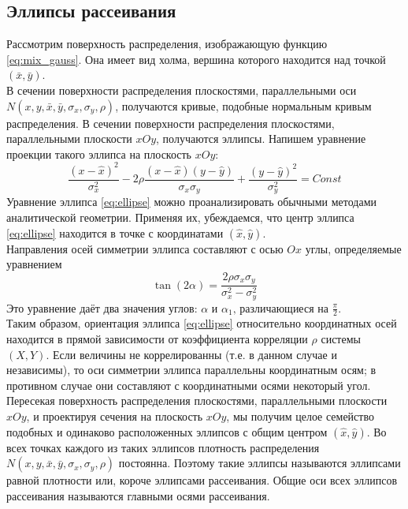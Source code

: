 \subsection{Эллипсы рассеивания}
Рассмотрим поверхность распределения, изображающую функцию \eqref{eq:mix_gauss}. Она имеет вид холма, вершина которого находится над точкой $(\bar{x}, \bar{y})$. \\
В сечении поверхности распределения плоскостями, параллельными оси $N(x, y, \bar{x}, \bar{y}, \sigma_{x}, \sigma_{y}, \rho)$, получаются кривые, подобные нормальным кривым распределения. В сечении поверхности распределения плоскостями, параллельными плоскости $xOy$, получаются эллипсы. Напишем уравнение проекции такого эллипса на плоскость $xOy$:
\begin{equation} \label{eq:ellipse}
	\dfrac{(x - \hat{x})^2}{\sigma_{x}^2} - 2 \rho \dfrac{(x - \hat{x}) (y - \hat{y})}{\sigma_{x} \sigma_{y}} + \dfrac{(y - \hat{y})^2}{\sigma_{y}^2} = Const
\end{equation}
Уравнение эллипса \eqref{eq:ellipse} можно проанализировать обычными методами аналитической геометрии. Применяя их, убеждаемся, что центр эллипса \eqref{eq:ellipse} находится в точке с координатами $(\hat{x}, \hat{y})$. \\
Направления осей симметрии эллипса составляют с осью $Ox$ углы, определяемые уравнением
\begin{equation}
	\tan(2 \alpha) = \dfrac{2 \rho \sigma_{x} \sigma_{y}}{\sigma_{x}^2 - \sigma_{y}^2}
\end{equation}
Это уравнение даёт два значения углов: $\alpha \text{ и } \alpha_1 \text{, различающиеся на } \frac{\pi}{2}$. \\
Таким образом, ориентация эллипса \eqref{eq:ellipse} относительно координатных осей находится в прямой зависимости от коэффициента корреляции $\rho$ системы $(X, Y)$. Если величины не коррелированны (т.е. в данном случае и независимы), то оси симметрии эллипса параллельны координатным осям; в противном случае они составляют с координатными осями некоторый угол. Пересекая поверхность распределения плоскостями, параллельными плоскости $xOy$, и проектируя сечения на плоскость $xOy$, мы получим целое семейство подобных и одинаково расположенных эллипсов с общим центром $(\hat{x}, \hat{y})$. Во всех точках каждого из таких эллипсов плотность распределения $N(x, y, \bar{x}, \bar{y}, \sigma_{x}, \sigma_{y}, \rho)$ постоянна. Поэтому такие эллипсы называются эллипсами равной плотности или, короче эллипсами рассеивания. Общие оси всех эллипсов рассеивания называются главными осями рассеивания.

